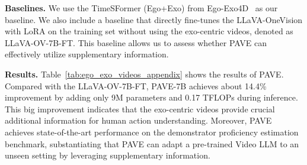 \medskip
\noindent\textbf{Baselines.}
We use the TimeSFormer (Ego+Exo) from Ego-Exo4D~\cite{grauman2024ego} as our baseline. We also include a baseline that directly fine-tunes the LLaVA-OneVision with LoRA on the training set without using the exo-centric videos, denoted as LLaVA-OV-7B-FT. This baseline allows us to assess whether PAVE can effectively utilize supplementary information.

\medskip
\noindent\textbf{Results.} Table~\ref{tab:ego_exo_videos_appendix} shows the results of PAVE. Compared with the LLaVA-OV-7B-FT, PAVE-7B achieves about 14.4\% improvement by adding only 9M parameters and 0.17 TFLOPs during inference. This big improvement indicates that the exo-centric videos provide crucial additional information for human action understanding.
Moreover, PAVE achieves state-of-the-art performance on the demonstrator proficiency estimation benchmark, substantiating that  PAVE can adapt a pre-trained Video LLM to an unseen setting by leveraging supplementary information. 




